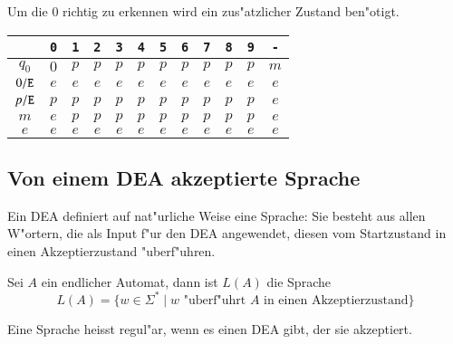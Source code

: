 \begin{beispiel} Um die $0$ richtig zu erkennen
wird ein zus"atzlicher Zustand ben"otigt.

\begin{center}
\begin{tabular}{|c|ccccccccccc|}
\hline
&\tt 0&\tt 1&\tt 2&\tt 3&\tt 4&\tt 5&\tt 6&\tt 7&\tt 8&\tt 9&\tt -\\
\hline
$q_0$&$0$&$p$&$p$&$p$&$p$&$p$&$p$&$p$&$p$&$p$&$m$\\
$0{\tt /E}$&$e$&$e$&$e$&$e$&$e$&$e$&$e$&$e$&$e$&$e$&$e$\\
$p{\tt /E}$&$p$&$p$&$p$&$p$&$p$&$p$&$p$&$p$&$p$&$p$&$e$\\
$m$&$e$&$p$&$p$&$p$&$p$&$p$&$p$&$p$&$p$&$p$&$e$\\
$e$&$e$&$e$&$e$&$e$&$e$&$e$&$e$&$e$&$e$&$e$&$e$\\
\hline
\end{tabular}
\end{center}

\end{beispiel}

\subsection{Von einem DEA akzeptierte Sprache\label{regulaer:akzeptiertesprache}}
Ein DEA definiert auf nat"urliche Weise eine Sprache: Sie besteht aus
allen W"ortern, die als Input f"ur den DEA angewendet, diesen vom
Startzustand in einen Akzeptierzustand "uberf"uhren.

\begin{definition}
Sei $A$ ein endlicher Automat, dann ist $L(A)$ die Sprache
\[
L(A)=\{w\in\Sigma^*\;|\; \text{$w$ "uberf"uhrt $A$ in einen Akzeptierzustand}\}
\]
\end{definition}

\begin{definition}
\label{regulaer:definition:regulaere-sprache}
Eine Sprache heisst regul"ar, wenn es einen DEA gibt, der sie
akzeptiert.
\end{definition}

